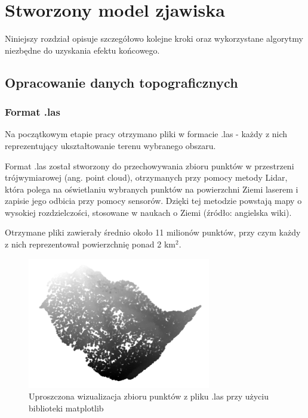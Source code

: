 \chapter{Stworzony model zjawiska}

Niniejszy rozdział opisuje szczegółowo kolejne kroki oraz wykorzystane algorytmy niezbędne do uzyskania efektu końcowego.


\section{Opracowanie danych topograficznych}
\subsection{Format .las}
Na początkowym etapie pracy otrzymano pliki w formacie .las - każdy z nich reprezentujący ukształtowanie terenu wybranego obszaru. 

Format .las został stworzony do przechowywania zbioru punktów w przestrzeni trójwymiarowej (ang. point cloud), otrzymanych przy pomocy metody Lidar, która polega na oświetlaniu wybranych punktów na powierzchni Ziemi laserem i zapisie jego odbicia przy pomocy sensorów. Dzięki tej metodzie powstają mapy o wysokiej rozdzielczości, stosowane w naukach o Ziemi (źródło: angielska wiki). 

Otrzymane pliki zawierały średnio około 11 milionów punktów, przy czym każdy z nich reprezentował powierzchnię ponad 2 km$^2$.

\begin{figure}[h]
	\includegraphics[width=8cm]{las_example}
	\centering
	\caption{Uproszczona wizualizacja zbioru punktów z pliku .las przy użyciu biblioteki matplotlib}
\end{figure}

